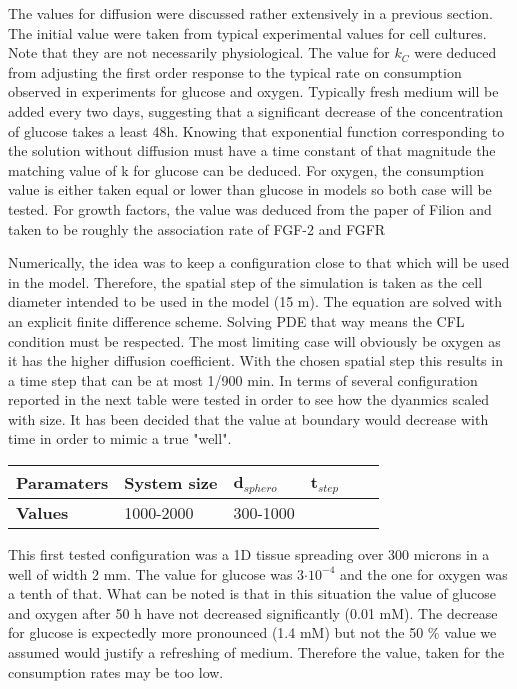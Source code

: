 \documentclass[11pt,a4paper]{article}
\begin{document}
The values for diffusion were discussed rather extensively in a previous section. The initial value were taken from typical experimental values for cell cultures. Note that they are not necessarily physiological. The value for $k_C$ were deduced from adjusting the first order response to the typical rate on consumption observed in experiments for glucose and oxygen. Typically fresh medium will be added every two days, suggesting that a significant decrease of the concentration of glucose takes a least 48h. Knowing that exponential function corresponding to the solution without diffusion must have a time constant of that magnitude the matching value of k for  glucose can be deduced. For oxygen, the consumption value is either taken equal or lower than glucose in models so both case will be tested.  For growth factors, the value was deduced from the paper of Filion\cite{Filion2004} and taken to be roughly the association rate of FGF-2 and FGFR

Numerically, the idea was to keep a configuration close to that which will be used in the model. Therefore, the spatial step of the simulation is taken as the cell diameter  intended to be used in the model (15 \textmu m). The equation are solved with an explicit finite difference scheme. Solving PDE that way means the CFL condition must be respected. The most limiting case will obviously be oxygen as it has the higher diffusion coefficient. With the chosen spatial step this results in a time step that can be at most 1/900 min. In terms of several configuration reported in the next table were tested in order to see how the dyanmics scaled with size. It has been decided that the value at boundary would decrease with time in order to mimic a true "well".

\begin{center}
\begin{tabular}{ |p{20mm}|p{10mm}|p{10mm}|p{10mm}|p{10mm}|p{10mm}| }
\hline
\textbf{Paramaters} & System size & d$_{sphero}$ & t$_{step}$ \\
\hline
\textbf{Values} & 1000-2000 & 300-1000 & \\
\hline
\end{tabular}
\end{center}

This first tested configuration was a 1D tissue spreading over 300 microns in a well of width 2 mm. The value for glucose was 3$\cdot 10^{-4}$ and the one for oxygen was a tenth of that. What can be noted is that in this situation the value of glucose and oxygen after 50 h have not decreased significantly (0.01 mM). The decrease for glucose is expectedly more pronounced (1.4 mM) but not the 50 \% value we assumed would justify a refreshing of medium. Therefore the value, taken for the consumption rates may be too low. 
\end{document}

